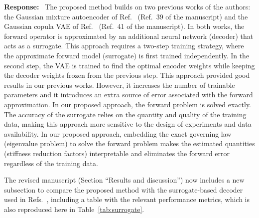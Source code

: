 \documentclass[11pt]{article}
\newenvironment{response}{\par\smallskip\noindent\color{resp}\textbf{Response:}\ }{\par}
\begin{document}
\begin{response}
The proposed method builds on two previous works of the authors: the Gaussian mixture autoencoder of Ref.~\cite{Navamuel_wes2025} (Ref.~39 of the manuscript) and the Gaussian copula VAE of Ref.~\cite{Arxiv_Navamuel2026copula2d} (Ref.~41 of the manuscript).
In both works, the forward operator is approximated by an additional neural network (decoder) that acts as a surrogate. 
This approach requires a two-step training strategy, where the approximate forward model (surrogate) is first trained independently. 
In the second step, the VAE is trained to find the optimal encoder weights while keeping the decoder weights frozen from the previous step. 
This approach provided good results in our previous works. 
However, it increases the number of trainable parameters and it introduces an extra source of error associated with the forward approximation. 
In our proposed approach, the forward problem is solved exactly. 
The accuracy of the surrogate relies on the quantity and quality of the training data, making this approach more sensitive to the design of experiments and data availability.  
In our proposed approach, embedding the exact governing law (eigenvalue problem) to solve the forward problem makes the estimated quantities (stiffness reduction factors) interpretable and eliminates the forward error regardless of the training data. 

The revised manuscript (Section ``Results and discussion'') now includes a new subsection to compare the proposed method with the surrogate-based decoder used in Refs.~\cite{Navamuel_wes2025,Arxiv_Navamuel2026copula2d}, including a table with the relevant performance metrics, which is also reproduced here in Table~\ref{tab:surrogate}.



\end{response}
\end{document}
